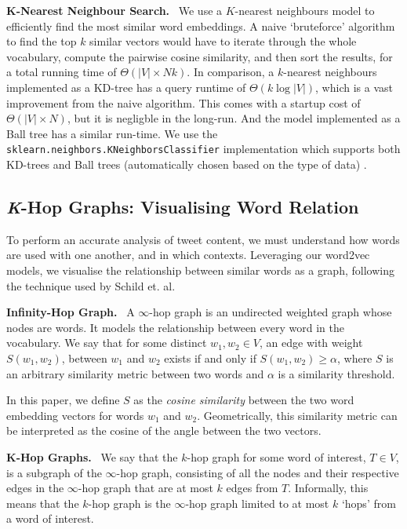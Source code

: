 \documentclass{paper}
\newcommand{\inlineSection}[1]{\vspace{0.5em}\noindent\textbf{#1.}~}
\begin{document}
\inlineSection{$\bm{K}$-Nearest Neighbour Search} We use a $K$-nearest neighbours model to efficiently find the most similar word embeddings. A naive `bruteforce' algorithm to find the top $k$ similar vectors would have to iterate through the whole vocabulary, compute the pairwise cosine similarity, and then sort the results, for a total running time of $\Theta(|V|\times Nk)$. In comparison, a $k$-nearest neighbours implemented as a KD-tree has a query runtime of $\Theta(k\log{|V|})$, which is a vast improvement from the naive algorithm. This comes with a startup cost of $\Theta(|V|\times N)$, but it is negligble in the long-run. And the model implemented as a Ball tree has a similar run-time. We use the \texttt{sklearn.neighbors.KNeighborsClassifier} implementation which supports both KD-trees and Ball trees (automatically chosen based on the type of data) \cite{scikit-learn}.

\subsection{\textit{K}-Hop Graphs: Visualising Word Relation}

To perform an accurate analysis of tweet content, we must understand how words are used with one another, and in which contexts. Leveraging our word2vec models, we visualise the relationship between similar words as a graph, following the technique used by Schild et. al. 

\inlineSection{Infinity-Hop Graph}
A $\infty$-hop graph is an undirected weighted graph whose nodes are words. It models the relationship between every word in the vocabulary. We say that for some distinct $w_1,w_2\in V$, an edge with weight $S(w_1,w_2)$, between $w_1$ and $w_2$ exists if and only if $S(w_1,w_2)\geq\alpha$, where $S$ is an arbitrary similarity metric between two words and $\alpha$ is a similarity threshold.

In this paper, we define $S$ as the \textit{cosine similarity} between the two word embedding vectors for words $w_1$ and $w_2$. Geometrically, this similarity metric can be interpreted as the cosine of the angle between the two vectors.

\inlineSection{$\bm{K}$-Hop Graphs} We say that the $k$-hop graph for some word of interest, $T\in V$, is a subgraph of the $\infty$-hop graph, consisting of all the nodes and their respective edges in the $\infty$-hop graph that are at most $k$ edges from $T$. Informally, this means that the $k$-hop graph is the $\infty$-hop graph limited to at most $k$ `hops' from a word of interest.
\end{document}
